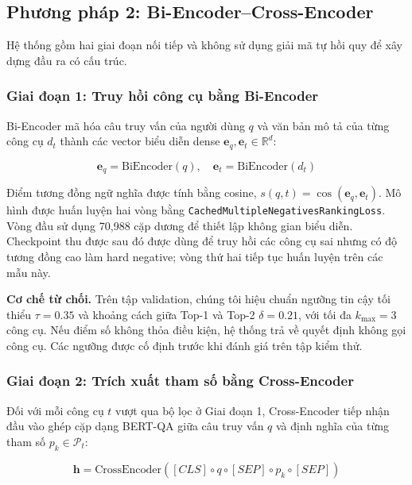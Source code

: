 \documentclass[10pt,twocolumn,a4paper]{article}
\begin{document}
\subsection{Phương pháp 2: Bi-Encoder--Cross-Encoder}

Hệ thống gồm hai giai đoạn nối tiếp và không sử dụng giải mã tự hồi quy để xây dựng đầu ra có cấu trúc.

\subsubsection{Giai đoạn 1: Truy hồi công cụ bằng Bi-Encoder}
Bi-Encoder mã hóa câu truy vấn của người dùng $q$ và văn bản mô tả của từng công cụ $d_t$ thành các vector biểu diễn dense $\mathbf{e}_q, \mathbf{e}_t \in \mathbb{R}^d$:

$$\mathbf{e}_q = \text{BiEncoder}(q), \quad \mathbf{e}_t = \text{BiEncoder}(d_t)$$

Điểm tương đồng ngữ nghĩa được tính bằng cosine, $s(q,t)=\cos(\mathbf{e}_q,\mathbf{e}_t)$. Mô hình được huấn luyện hai vòng bằng \texttt{CachedMultipleNegativesRankingLoss}. Vòng đầu sử dụng 70,988 cặp dương để thiết lập không gian biểu diễn. Checkpoint thu được sau đó được dùng để truy hồi các công cụ sai nhưng có độ tương đồng cao làm hard negative; vòng thứ hai tiếp tục huấn luyện trên các mẫu này.

\textbf{Cơ chế từ chối.} Trên tập validation, chúng tôi hiệu chuẩn ngưỡng tin cậy tối thiểu $\tau = 0.35$ và khoảng cách giữa Top-1 và Top-2 $\delta = 0.21$, với tối đa $k_{\max}=3$ công cụ. Nếu điểm số không thỏa điều kiện, hệ thống trả về quyết định không gọi công cụ. Các ngưỡng được cố định trước khi đánh giá trên tập kiểm thử.

\subsubsection{Giai đoạn 2: Trích xuất tham số bằng Cross-Encoder}
Đối với mỗi công cụ $t$ vượt qua bộ lọc ở Giai đoạn 1, Cross-Encoder tiếp nhận đầu vào ghép cặp dạng BERT-QA giữa câu truy vấn $q$ và định nghĩa của từng tham số $p_k \in \mathcal{P}_t$:

$$\mathbf{h} = \text{CrossEncoder}([CLS] \circ q \circ [SEP] \circ p_k \circ [SEP])$$
\end{document}
